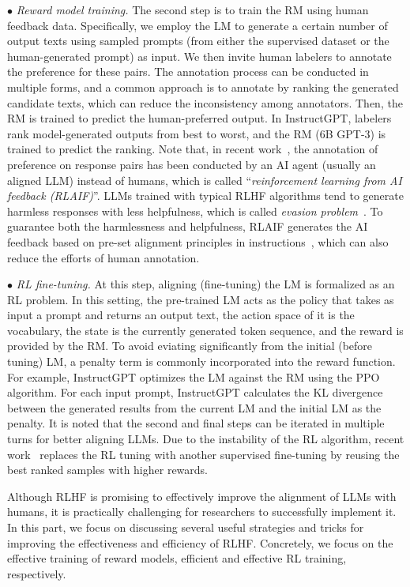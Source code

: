 $\bullet$ \textit{Reward model training.} The second step is to train the RM using human feedback data. Specifically, we employ the LM to generate a certain number of output texts using sampled prompts (from either the supervised dataset or the human-generated prompt) as input. We then invite human labelers to annotate the preference for these pairs. The annotation process can be conducted in multiple forms, and a common approach is to annotate by ranking the generated candidate texts, which can reduce  the inconsistency among annotators. Then,  the RM is trained to predict the human-preferred output. In InstructGPT, labelers rank model-generated outputs from best to worst, and the RM (\ie 6B GPT-3) is trained to predict the ranking. Note that, in recent work~\cite{Bai-arXiv-2022-Constitutional}, the annotation of preference on response pairs has been conducted by an AI agent (usually an aligned LLM) instead of humans, which is called ``\emph{reinforcement learning from AI feedback (RLAIF)}''. 
{LLMs trained with typical RLHF algorithms tend to generate harmless responses with less helpfulness, which is  called  \emph{evasion problem}~\cite{Bai-arXiv-2022-Constitutional}. To  guarantee both the harmlessness and helpfulness, RLAIF generates the AI feedback based on pre-set alignment principles in instructions~\cite{Bai-arXiv-2022-Constitutional,Lee-CoRR-2023-RLAIF}, which can also reduce  the efforts of human annotation.} 


$\bullet$ \textit{RL fine-tuning.} At this step, aligning (\ie fine-tuning) the LM is formalized as an RL problem. In this setting, the pre-trained LM acts as the policy that takes as input a prompt and returns an output text, the action space of it is the vocabulary, the state is the currently generated token sequence, and the reward is provided by the RM. To avoid eviating significantly from the initial (before tuning) LM, a penalty term is commonly incorporated into the reward function. 
For example, InstructGPT optimizes the LM against the RM using the PPO algorithm. 
For each input prompt, InstructGPT calculates the KL divergence between the generated results from the current LM and the initial LM as the penalty.
It is noted that the second and final steps can be iterated in multiple turns for better aligning LLMs. 
Due to the instability of the RL algorithm, recent work~\cite{Dong-RAFT-2023-arxiv} replaces the RL tuning with another supervised fine-tuning by reusing the best ranked samples with higher rewards.

{Although RLHF is promising to effectively improve the alignment of LLMs with humans, it is practically challenging for researchers to successfully implement  it.
In this part, we focus on discussing several useful  strategies and tricks for improving the effectiveness and efficiency of RLHF. 
Concretely, we focus on the effective training of reward models, efficient and effective RL training, respectively.}

